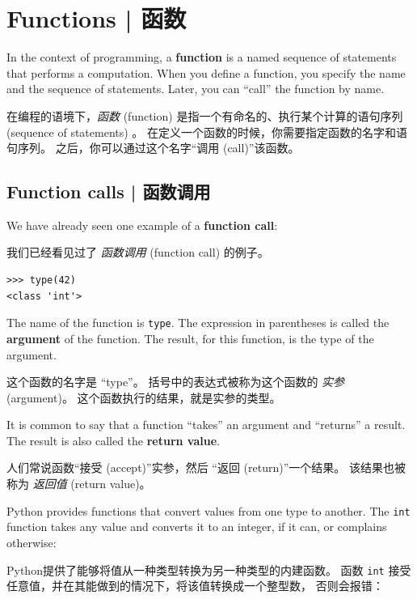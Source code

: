 
\chapter{Functions  |  函数}
\label{funcchap}

In the context of programming, a {\bf function} is a named sequence of
statements that performs a computation.  When you define a function,
you specify the name and the sequence of statements.  Later, you can
``call'' the function by name.

在编程的语境下，\emph{函数} (function)  是指一个有命名的、执行某个计算的语句序列(sequence of statements) 。  在定义一个函数的时候，你需要指定函数的名字和语句序列。  之后，你可以通过这个名字``调用 (call)''该函数。


%
\section{Function calls  |  函数调用}
\label{functionchap}

We have already seen one example of a {\bf function call}:

我们已经看见过了 \emph{函数调用} (function call) 的例子。

\begin{lstlisting}
>>> type(42)
<class 'int'>
\end{lstlisting}
%
The name of the function is {\tt type}.  The expression in parentheses
is called the {\bf argument} of the function.  The result, for this
function, is the type of the argument.

这个函数的名字是 ``type''。 括号中的表达式被称为这个函数的 \emph{实参} (argument)。 这个函数执行的结果，就是实参的类型。

It is common to say that a function ``takes'' an argument and ``returns''
a result.  The result is also called the {\bf return value}.

人们常说函数``接受 (accept)''实参，然后 ``返回 (return)''一个结果。
该结果也被称为 \emph{返回值} (return value)。
  
  

Python provides functions that convert values
from one type to another.  The {\tt int} function takes any value and
converts it to an integer, if it can, or complains otherwise:

Python提供了能够将值从一种类型转换为另一种类型的内建函数。
函数 \lstinline{int} 接受任意值，并在其能做到的情况下，将该值转换成一个整型数，
否则会报错：
  
  
  
  

